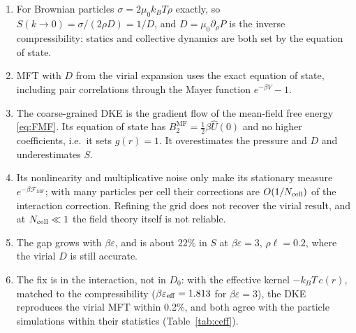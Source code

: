 \documentclass[11pt]{article}
\newcommand{\Uh}{\hat U}
\newcommand{\MF}{\mathrm{MF}}
\begin{document}
\begin{enumerate}[nosep]
  \item For Brownian particles $\sigma=2\mu_0k_BT\rho$ exactly, so
        $S(k\to0)=\sigma/(2\rho D)=1/D$, and $D=\mu_0\partial_\rho P$ is the
        inverse compressibility: statics and collective dynamics are both set by
        the equation of state.
  \item MFT with $D$ from the virial expansion uses the exact equation of
        state, including pair correlations through the Mayer function
        $e^{-\beta V}-1$.
  \item The coarse-grained DKE is the gradient flow of the mean-field free
        energy \eqref{eq:FMF}. Its equation of state has
        $B_2^\MF=\tfrac12\beta\Uh(0)$ and no higher coefficients, i.e.\ it sets
        $g(r)=1$. It overestimates the pressure and $D$ and underestimates $S$.
  \item Its nonlinearity and multiplicative noise only make its stationary
        measure $e^{-\beta\mathcal F_\MF}$; with many particles per cell their
        corrections are $O(1/N_{\rm cell})$ of the interaction correction.
        Refining the grid does not recover the virial result, and at
        $N_{\rm cell}\ll1$ the field theory itself is not reliable.
  \item The gap grows with $\beta\varepsilon$, and is about 22\% in $S$ at
        $\beta\varepsilon=3$, $\rho\ell=0.2$, where the virial $D$ is still
        accurate.
  \item The fix is in the interaction, not in $D_0$: with the effective
        kernel $-k_BT\,c(r)$, matched to the compressibility
        ($\beta\varepsilon_{\rm eff}=1.813$ for $\beta\varepsilon=3$), the DKE
        reproduces the virial MFT within 0.2\%, and both agree with the
        particle simulations within their statistics (Table~\ref{tab:ceff}).
\end{enumerate}
\end{document}
